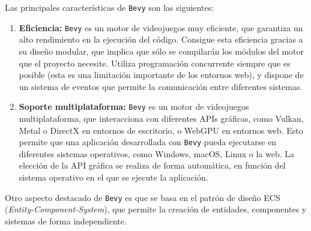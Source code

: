 Las principales características de \texttt{Bevy} son las siguientes:
\begin{enumerate}
    \item \textbf{Eficiencia:} \texttt{Bevy} es un motor de videojuegos muy eficiente, que garantiza un alto rendimiento en la ejecución del código. Consigue esta eficiencia gracias a su diseño modular, que implica que sólo se compilarán los módulos del motor que el proyecto necesite. Utiliza programación concurrente siempre que es posible (esta es una limitación importante de los entornos web), y dispone de un sistema de eventos que permite la comunicación entre diferentes sistemas.
    \item \textbf{Soporte multiplataforma:} \texttt{Bevy} es un motor de videojuegos multiplataforma, que interacciona con diferentes APIs gráficas, como Vulkan, Metal o DirectX en entornos de escritorio, o WebGPU en entornos web. Esto permite que una aplicación desarrollada con \texttt{Bevy} pueda ejecutarse en diferentes sistemas operativos, como Windows, macOS, Linux o la web. La elección de la API gráfica se realiza de forma automática, en función del sistema operativo en el que se ejecute la aplicación.
\end{enumerate}

Otro aspecto destacado de \texttt{Bevy} es que se basa en el patrón de diseño ECS (\textit{Entity-Component-System}), que permite la creación de entidades, componentes y sistemas de forma independiente. 
